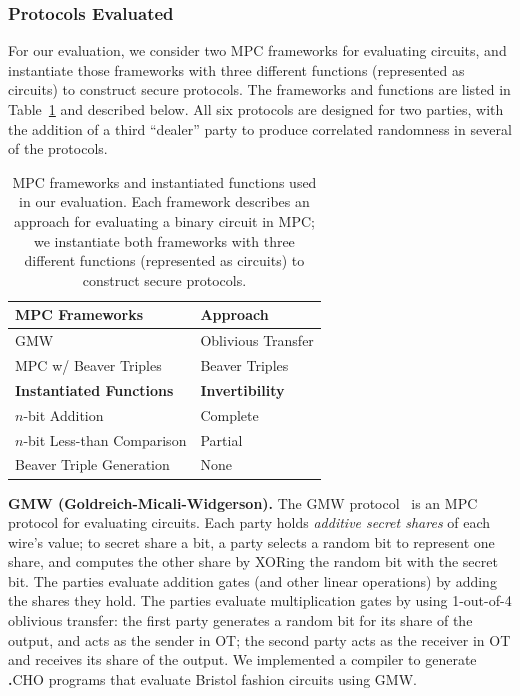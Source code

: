 \documentclass[compsoc, conference, a4paper, 10pt, times]{IEEEtran}
\renewcommand{\paragraph}[1]{\vspace*{2pt}\noindent\textbf{#1}}
\newcommand{\langname}{\textsc{\textbf{.}CHO}\xspace}
\begin{document}
\subsubsection{Protocols Evaluated}
\label{sec:protocols-evaluated}

For our evaluation, we consider two MPC frameworks for evaluating circuits, and instantiate those frameworks with three different functions (represented as circuits) to construct secure protocols. The frameworks and functions are listed in Table~\ref{tbl:protocols} and described below.
All six protocols are designed for two parties, with the addition of a third ``dealer'' party to produce correlated randomness in several of the protocols.

\begin{table}
  \centering
  \renewcommand*{\arraystretch}{1.2}
  \begin{tabular}{|l l|}
    \hline
    \textbf{MPC Frameworks} & \textbf{Approach} \\
    \hline
    GMW~\cite{goldreich2019play, goldreich2009foundations} & Oblivious Transfer\\
    MPC w/ Beaver Triples~\cite{beaver1992efficient} & Beaver Triples\\[4pt]
    \hline
    \textbf{Instantiated Functions} & \textbf{Invertibility}\\
    \hline
    $n$-bit Addition & Complete \\
    $n$-bit Less-than Comparison & Partial \\
    Beaver Triple Generation & None \\
    \hline
  \end{tabular}
  \bigskip
  \caption{MPC frameworks and instantiated functions used in our evaluation. Each framework describes an approach for evaluating a binary circuit in MPC; we instantiate both frameworks with three different functions (represented as circuits) to construct secure protocols. }
  \label{tbl:protocols}
\end{table}

\paragraph{GMW (Goldreich-Micali-Widgerson).}
The GMW protocol~\cite{goldreich2019play, goldreich2009foundations} is an MPC protocol for evaluating circuits. Each party holds \emph{additive secret shares} of each wire's value; to secret share a bit, a party selects a random bit to represent one share, and computes the other share by XORing the random bit with the secret bit.
%
The parties evaluate addition gates (and other linear operations) by adding the shares they hold.
%
The parties evaluate multiplication gates by using 1-out-of-4 oblivious transfer: the first party generates a random bit for its share of the output, and acts as the sender in OT; the second party acts as the receiver in OT and receives its share of the output. We implemented a compiler to generate \langname programs that evaluate Bristol fashion circuits using GMW.
\end{document}
